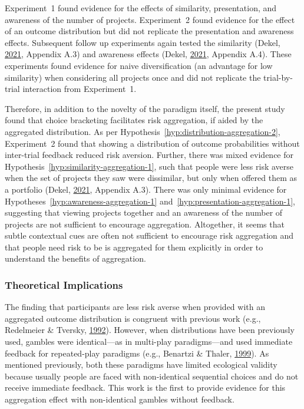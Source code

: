 \documentclass[
  english,
  man, donotrepeattitle,floatsintext]{apa7}
\theoremstyle{definition}
\theoremstyle{definition}
\theoremstyle{definition}
\theoremstyle{definition}
\theoremstyle{remark}
\begin{document}
Experiment~1 found evidence for the effects of similarity, presentation, and
awareness of the number of projects. Experiment~2 found evidence for the effect
of an outcome distribution but did not replicate the presentation and awareness
effects. Subsequent follow up experiments again tested the similarity
(Dekel, \protect\hyperlink{ref-dekel2021b}{2021}, Appendix A.3) and awareness effects (Dekel, \protect\hyperlink{ref-dekel2021b}{2021}, Appendix
A.4). These experiments found evidence for naive diversification (an advantage
for low similarity) when considering all projects once and did not replicate the
trial-by-trial interaction from Experiment~1.

Therefore, in addition to the novelty of the paradigm itself, the present study
found that choice bracketing facilitates risk aggregation, if aided by the
aggregated distribution. As per Hypothesis~\ref{hyp:distribution-aggregation-2},
Experiment~2 found that showing a distribution of outcome probabilities without
inter-trial feedback reduced risk aversion. Further, there was mixed evidence
for Hypothesis~\ref{hyp:similarity-aggregation-1}, such that people were less
risk averse when the set of projects they saw were dissimilar, but only when
offered them as a portfolio (Dekel, \protect\hyperlink{ref-dekel2021b}{2021}, Appendix A.3). There was only
minimal evidence for Hypotheses~\ref{hyp:awareness-aggregation-1}
and~\ref{hyp:presentation-aggregation-1}, suggesting that viewing projects
together and an awareness of the number of projects are not sufficient to
encourage aggregation. Altogether, it seems that subtle contextual cues are
often not sufficient to encourage risk aggregation and that people need risk to
be is aggregated for them explicitly in order to understand the benefits of
aggregation.

\hypertarget{theoretical-implications}{%
\subsubsection{Theoretical Implications}\label{theoretical-implications}}

The finding that participants are less risk averse when provided with an
aggregated outcome distribution is congruent with previous work (e.g., Redelmeier \& Tversky, \protect\hyperlink{ref-redelmeier1992}{1992}). However, when distributions have been previously used, gambles
were identical---as in multi-play paradigms---and used immediate feedback for
repeated-play paradigms (e.g., Benartzi \& Thaler, \protect\hyperlink{ref-benartzi1999}{1999}). As mentioned previously, both
these paradigms have limited ecological validity because usually people are
faced with non-identical sequential choices and do not receive immediate
feedback. This work is the first to provide evidence for this aggregation effect
with non-identical gambles without feedback.
\end{document}
